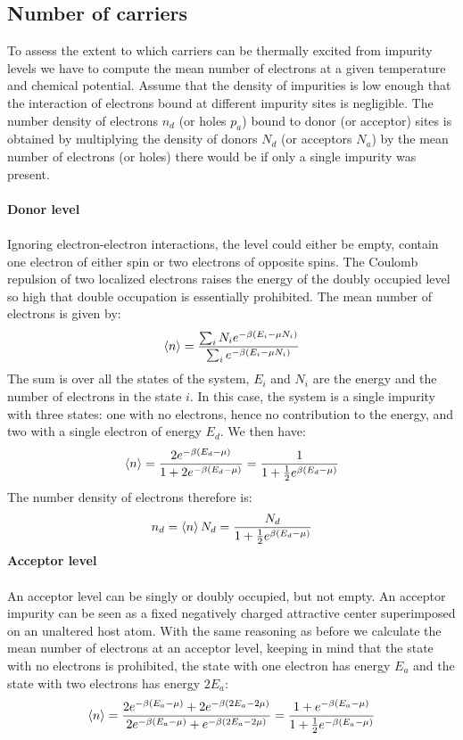 \documentclass[10.75pt,a4paper,openright,bottom=2cm]{article}
\begin{document}
\subsection{Number of carriers}
To assess the extent to which carriers can be thermally excited from impurity levels we have to compute the mean number of electrons at a given temperature and chemical potential. Assume that the density of impurities is low enough that the interaction of electrons bound at different impurity sites is negligible. The number density of electrons $n_d$ (or holes $p_a$) bound to donor (or acceptor) sites is obtained by multiplying the density of donors $N_d$ (or acceptors $N_a$) by the mean number of electrons (or holes) there would be if only a single impurity was present.\\\\
\textbf{Donor level}\\\\
Ignoring electron-electron interactions, the level could either be empty, contain one electron of either spin or two electrons of opposite spins. The Coulomb repulsion of two localized electrons raises the energy of the doubly occupied level so high that double occupation is essentially prohibited. The mean number of electrons is given by:
\[
\Braket{n}=\frac{\sum_iN_ie^{-\beta(E_i-\mu N_i)}}{\sum_ie^{-\beta(E_i-\mu N_i)}}
\]
The sum is over all the states of the system, $E_i$ and $N_i$ are the energy and the number of electrons in the state $i$. In this case, the system is a single impurity with three states: one with no electrons, hence no contribution to the energy, and two with a single electron of energy $E_d$. We then have:
\[
\Braket{n}=\frac{2e^{-\beta(E_d-\mu)}}{1+2e^{-\beta(E_d-\mu)}}=\frac{1}{1+\frac{1}{2}e^{\beta(E_d-\mu)}}
\]
The number density of electrons therefore is:
\[
n_d=\Braket{n}N_d=\frac{N_d}{1+\frac{1}{2}e^{\beta(E_d-\mu)}}
\]
\textbf{Acceptor level}\\\\
An acceptor level can be singly or doubly occupied, but not empty. An acceptor impurity can be seen as a fixed negatively charged attractive center superimposed on an unaltered host atom. With the same reasoning as before we calculate the mean number of electrons at an acceptor level, keeping in mind that the state with no electrons is prohibited, the state with one electron has energy $E_a$ and the state with two electrons has energy $2E_a$:
\[
\Braket{n}=\frac{2e^{-\beta(E_a-\mu)}+2e^{-\beta(2E_a-2\mu)}}{2e^{-\beta(E_a-\mu)}+e^{-\beta(2E_a-2\mu)}}=\frac{1+e^{-\beta(E_a-\mu)}}{1+\frac{1}{2}e^{-\beta(E_a-\mu)}}
\]
\end{document}
